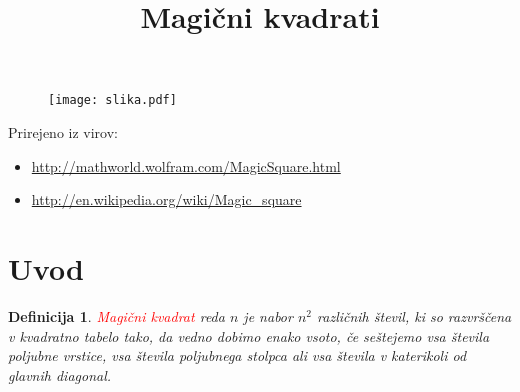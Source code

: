 \documentclass[a4paper,12pt]{article}
\title{Magični kvadrati}
\date{}
\newtheorem{definition}{Definicija}
\begin{document}
\maketitle

\begin{figure}[!ht]
   \centering
   \texttt{[image: slika.pdf]}
   \label{fig: slika1}
\end{figure}
Prirejeno iz virov:

\begin{itemize}
   \item \url{http://mathworld.wolfram.com/MagicSquare.html}
   \item \url{http://en.wikipedia.org/wiki/Magic_square}
\end{itemize}

\tableofcontents

\newpage

\section{Uvod}

\begin{definition}
   \textcolor{red}{\emph{Magični kvadrat}} reda $n$ je nabor $n^2$ različnih števil,
   ki so razvrščena v kvadratno tabelo tako, da vedno dobimo enako vsoto,
   če seštejemo vsa števila poljubne vrstice, vsa števila poljubnega
   stolpca ali vsa števila v katerikoli od glavnih diagonal.
\end{definition}
\end{document}

